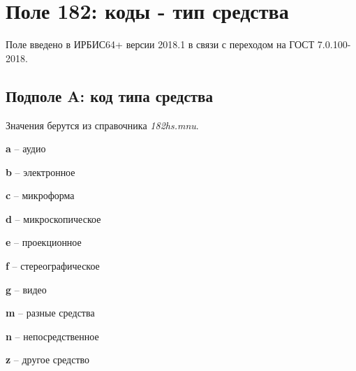 \chapter{Поле 182: коды - тип средства}

Поле введено в ИРБИС64+ версии 2018.1 в связи с переходом на ГОСТ 7.0.100-2018.

\section{Подполе A: код типа средства}

Значения берутся из справочника \emph{182hs.mnu}.

\begin{cutelist}
    \item \textbf{a} -- аудио
    \item \textbf{b} -- электронное
    \item \textbf{c} -- микроформа
    \item \textbf{d} -- микроскопическое
    \item \textbf{e} -- проекционное
    \item \textbf{f} -- стереографическое
    \item \textbf{g} -- видео
    \item \textbf{m} -- разные средства
    \item \textbf{n} -- непосредственное
    \item \textbf{z} -- другое средство
\end{cutelist}